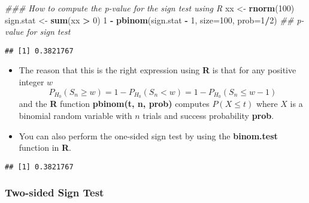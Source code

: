 \documentclass[]{book}
\newenvironment{Shaded}{\begin{snugshade}}{\end{snugshade}}
\newcommand{\CommentTok}[1]{\textcolor[rgb]{0.56,0.35,0.01}{\textit{#1}}}
\newcommand{\DataTypeTok}[1]{\textcolor[rgb]{0.13,0.29,0.53}{#1}}
\newcommand{\DecValTok}[1]{\textcolor[rgb]{0.00,0.00,0.81}{#1}}
\newcommand{\FloatTok}[1]{\textcolor[rgb]{0.00,0.00,0.81}{#1}}
\newcommand{\KeywordTok}[1]{\textcolor[rgb]{0.13,0.29,0.53}{\textbf{#1}}}
\newcommand{\NormalTok}[1]{#1}
\newcommand{\OperatorTok}[1]{\textcolor[rgb]{0.81,0.36,0.00}{\textbf{#1}}}
\newcommand{\StringTok}[1]{\textcolor[rgb]{0.31,0.60,0.02}{#1}}
\begin{document}
\begin{Shaded}
\begin{Highlighting}[]
\CommentTok{### How to compute the p-value for the sign test using R}
\NormalTok{xx <-}\StringTok{ }\KeywordTok{rnorm}\NormalTok{(}\DecValTok{100}\NormalTok{)}
\NormalTok{sign.stat <-}\StringTok{ }\KeywordTok{sum}\NormalTok{(xx }\OperatorTok{>}\StringTok{ }\DecValTok{0}\NormalTok{)}
\DecValTok{1} \OperatorTok{-}\StringTok{ }\KeywordTok{pbinom}\NormalTok{(sign.stat }\OperatorTok{-}\StringTok{ }\DecValTok{1}\NormalTok{, }\DataTypeTok{size=}\DecValTok{100}\NormalTok{, }\DataTypeTok{prob=}\DecValTok{1}\OperatorTok{/}\DecValTok{2}\NormalTok{) }\CommentTok{## p-value for sign test}
\end{Highlighting}
\end{Shaded}

\begin{verbatim}
## [1] 0.3821767
\end{verbatim}

\begin{itemize}
\item
  The reason that this is the right expression using \textbf{R} is that for any positive integer \(w\)
  \begin{equation}
  P_{H_{0}}(S_{n} \geq w) = 1 - P_{H_{0}}(S_{n} < w) = 1 - P_{H_{0}}(S_{n} \leq w - 1)
  \end{equation}
  and the \textbf{R} function \textbf{pbinom(t, n, prob)} computes \(P(X \leq t)\) where \(X\) is
  a binomial random variable with \(n\) trials and success probability \textbf{prob}.
\item
  You can also perform the one-sided sign test by using the \textbf{binom.test} function in \textbf{R}.
\end{itemize}

\begin{Shaded}
\end{Shaded}

\begin{verbatim}
## [1] 0.3821767
\end{verbatim}

\hypertarget{two-sided-sign-test}{%
\subsubsection{Two-sided Sign Test}\label{two-sided-sign-test}}
\end{document}
